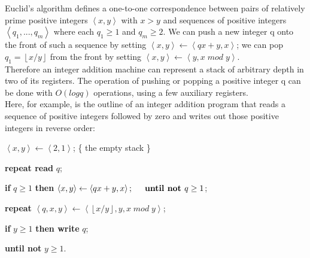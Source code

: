 \documentclass{article}
\begin{document}
\begin{multicols}{3}
{\begin{minipage}[t]{.96\linewidth}
    \hspace{.5cm}Euclid's algorithm  defines a  one-to-one correspondence  between  pairs of  relatively  prime  positive integers  $\left \langle x,y \right \rangle$
  with  $x>y$  and  sequences of positive integers $ \left \langle q_{1},...,q_{m} \right \rangle$  where each $q_{1}\geq 1 $ and $ q_{m}\geq 2$. We can  push a new integer q onto the  front of such a sequence by setting
$\left \langle x,y \right \rangle\leftarrow \left \langle qx+y,x \right \rangle$; we can pop $q_{1} = \left \lfloor x/y \right \rfloor$ from the front by setting $\left \langle x,y \right \rangle\leftarrow \left \langle y,x\; mod \; y \right \rangle$.\\

\hspace{.5cm}Therefore an integer addition machine can represent a stack of arbitrary depth in two of  its  registers. The  operation of pushing or  popping a positive integer q can be done with $O(logq)$ operations, using a few auxiliary registers.\\

\hspace{.5cm}Here, for example, is the  outline of an  integer  addition  program that reads a sequence of positive integers followed by zero and writes out those positive integers in reverse order:

\hspace{.5cm}$\left \langle x,y \right \rangle\leftarrow \left \langle 2,1 \right \rangle$; \hspace{.5cm} \left \{ the\; empty\; stack \right \}

\hspace{.5cm}\textbf{repeat read } $q$;

\hspace{1cm}\textbf{if }$ q \geq 1$ \textbf{then }$ \left \langle x,y \right \rangle\leftarrow \left \langle qx+y,x \right \rangle;

\hspace{.5cm}\textbf{until not } q\geq 1$;

\hspace{.5cm}\textbf{repeat }$ \left \langle q,x,y \right \rangle\leftarrow \left \langle \left \lfloor x/y \right \rfloor,y,x\; mod \; y \right \rangle$;

\hspace{1cm}\textbf{if }$ y\geq 1$ \textbf{then write} $q$;

\hspace{.5cm}\textbf{until not} $ y\geq 1$.
    \\\hspace{.05cm}
  \end{minipage}
}


\end{multicols}
\end{document}
